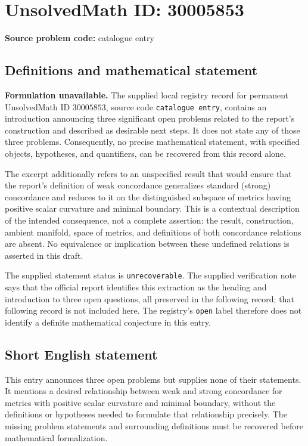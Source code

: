 \documentclass[11pt]{article}
\begin{document}
\section*{UnsolvedMath ID: 30005853}
\textbf{Source problem code:} catalogue entry
\subsection{Definitions and mathematical statement}
\textbf{Formulation unavailable.} The supplied local registry record for permanent UnsolvedMath ID \(30005853\), source code \texttt{catalogue entry}, contains an introduction announcing three significant open problems related to the report's construction and described as desirable next steps. It does not state any of those three problems. Consequently, no precise mathematical statement, with specified objects, hypotheses, and quantifiers, can be recovered from this record alone.

The excerpt additionally refers to an unspecified result that would ensure that the report's definition of weak concordance generalizes standard (strong) concordance and reduces to it on the distinguished subspace of metrics having positive scalar curvature and minimal boundary. This is a contextual description of the intended consequence, not a complete assertion: the result, construction, ambient manifold, space of metrics, and definitions of both concordance relations are absent. No equivalence or implication between these undefined relations is asserted in this draft.

The supplied statement status is \texttt{unrecoverable}. The supplied verification note says that the official report identifies this extraction as the heading and introduction to three open questions, all preserved in the following record; that following record is not included here. The registry's \texttt{open} label therefore does not identify a definite mathematical conjecture in this entry.
\subsection{Short English statement}
This entry announces three open problems but supplies none of their statements. It mentions a desired relationship between weak and strong concordance for metrics with positive scalar curvature and minimal boundary, without the definitions or hypotheses needed to formulate that relationship precisely. The missing problem statements and surrounding definitions must be recovered before mathematical formalization.
\end{document}
